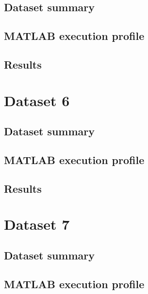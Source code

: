 
\subsection{Dataset summary}

\subsection{MATLAB execution profile}

\subsection{Results}

\section{Dataset 6}


\subsection{Dataset summary}

\subsection{MATLAB execution profile}

\subsection{Results}

\section{Dataset 7}


\subsection{Dataset summary}

\subsection{MATLAB execution profile}

